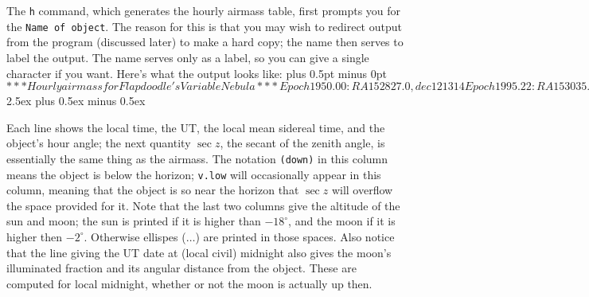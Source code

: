 The {\tt h} command, which generates the hourly airmass table, first 
prompts you for the {\tt Name of object}.  The reason for this is 
that you may wish to redirect output from the program (discussed 
later) to make a hard copy; the name then serves to label the output.
The name serves only as a label, so you can give a single character
if you want.  Here's what the output looks like:
\parskip 0pt plus 0.5pt minus 0pt
\verbatim$

*** Hourly airmass for Flapdoodle's Variable Nebula ***

Epoch 1950.00: RA  15 28 27.0, dec  12 13 14
Epoch 1995.22: RA  15 30 35.7, dec  12 04 01

At midnight: UT date 1995 Mar 23, Moon 0.56 illum,  45 degr from obj

  Local      UT      LMST      HA     secz   par.angl. SunAlt MoonAlt

  19 00     2 00     6 34    -8 57   (down)   -43.5     -5.2    ... 
  20 00     3 00     7 34    -7 57   (down)   -50.8    -17.8    ... 
  21 00     4 00     8 34    -6 56   (down)   -55.7     ...     ... 
  22 00     5 00     9 34    -5 56    8.033   -58.8     ...     ... 
  23 00     6 00    10 35    -4 56    2.947   -60.1     ...     ... 
   0 00     7 00    11 35    -3 56    1.857   -59.6     ...     ... 
   1 00     8 00    12 35    -2 56    1.412   -56.5     ...     -0.3
   2 00     9 00    13 35    -1 56    1.194   -48.5     ...     10.5
   3 00    10 00    14 35    -0 55    1.091   -30.4     ...     20.4
   4 00    11 00    15 35     0 05    1.064     3.0     ...     28.8
   5 00    12 00    16 36     1 05    1.102    34.4     ...     34.8
   6 00    13 00    17 36     2 05    1.220    50.3     -6.5    37.8
$
\medskip
\parskip 2.5ex plus 0.5ex minus 0.5ex

Each line shows the local time, the UT, the local mean sidereal time, 
and the object's hour angle; the next
quantity $\sec z$, the secant of the zenith angle, is essentially
the same thing as the airmass.   The notation {\tt (down)} in
this column means the object is below the horizon; {\tt v.low}
will occasionally appear in this column, meaning that the
object is so near the horizon that $\sec z$ will overflow the
space provided for it.   Note that the last two columns
give the altitude of the sun and moon; the sun is printed if 
it is higher than $-18^{\circ}$, and the moon if it is higher
then $-2^{\circ}$.  Otherwise ellispes (${\ldots}$) are 
printed in those spaces.  Also notice that the line giving
the UT date at (local civil) 
midnight also gives the moon's illuminated fraction and its angular
distance from the object.  These are computed for local midnight, whether
or not the moon is actually up then. 

